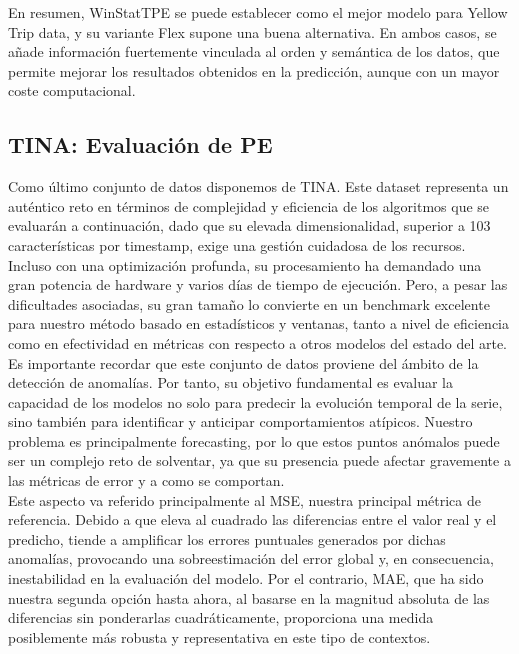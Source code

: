 En resumen, WinStatTPE se puede establecer como el mejor modelo para Yellow Trip data, y su variante Flex supone una buena alternativa. En ambos casos, se añade información fuertemente vinculada al orden y semántica de los datos, que permite mejorar los resultados obtenidos en la predicción, aunque con un mayor coste computacional.


\subsection{TINA: Evaluación de PE}

Como último conjunto de datos disponemos de TINA. Este dataset representa un auténtico reto en términos de complejidad y eficiencia de los algoritmos que se evaluarán a continuación, dado que su elevada dimensionalidad, superior a 103 características por timestamp, exige una gestión cuidadosa de los recursos. Incluso con una optimización profunda, su procesamiento ha demandado una gran potencia de hardware y varios días de tiempo de ejecución. Pero, a pesar las dificultades asociadas, su gran tamaño lo convierte en un benchmark excelente para nuestro método basado en estadísticos y ventanas, tanto a nivel de eficiencia como en efectividad en métricas con respecto a otros modelos del estado del arte.\\

Es importante recordar que este conjunto de datos proviene del ámbito de la detección de anomalías. Por tanto, su objetivo fundamental es evaluar la capacidad de los modelos no solo para predecir la evolución temporal de la serie, sino también para identificar y anticipar comportamientos atípicos. Nuestro problema es principalmente forecasting, por lo que estos puntos anómalos puede ser un complejo reto de solventar, ya que su presencia puede afectar gravemente a las métricas de error y a como se comportan.\\

Este aspecto va referido principalmente al MSE, nuestra principal métrica de referencia. Debido a que eleva al cuadrado las diferencias entre el valor real y el predicho, tiende a amplificar los errores puntuales generados por dichas anomalías, provocando una sobreestimación del error global y, en consecuencia, inestabilidad en la evaluación del modelo. Por el contrario, MAE, que ha sido nuestra segunda opción hasta ahora, al basarse en la magnitud absoluta de las diferencias sin ponderarlas cuadráticamente, proporciona una medida posiblemente más robusta y representativa en este tipo de contextos.\\

